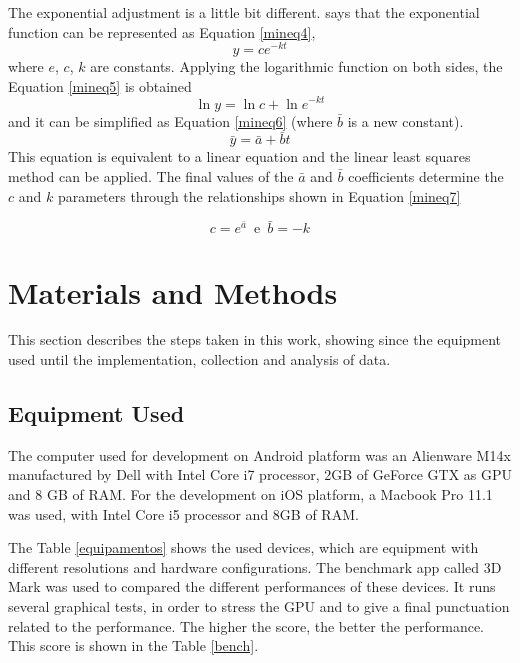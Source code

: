 \documentclass[10pt, conference, compsocconf]{IEEEtran}
\begin{document}
{The exponential adjustment is a little bit different. \cite{calculo} says
that the exponential function can be represented as Equation \ref{mineq4},
\begin{equation}
	\label{mineq4}
		y = ce^{-kt}
	\end{equation}
where $e$, $c$, $k$ are constants. Applying the logarithmic function on
both sides, the Equation \ref{mineq5} is obtained \begin{equation}
	\label{mineq5}
		\ln{y} = \ln{c}  + \ln{e^{-kt}}
	\end{equation}
	and it can be simplified
as Equation \ref{mineq6} (where $\bar{b}$ is a new constant). 
\begin{equation}
	\label{mineq6}
		\bar{y} = \bar{a} + \bar{b}t
	\end{equation}	
This equation
is equivalent to a linear equation and the linear least squares method can be applied.
The final values of the $\bar{a}$ and $\bar{b}$ coefficients determine
the $c$ and $k$ parameters through  the relationships shown in Equation \ref{mineq7}

\begin{equation}
  \label{mineq7}
	c = e^{\bar{a}}\, \, \, \mbox{e}\, \, \,\bar{b} = -k
	\end{equation} 
\section{Materials and Methods}
\label{sec:development}

This section describes the steps taken in this work, showing since the
equipment used until the implementation, collection and analysis of data.

\subsection{Equipment Used}
\label{equip}
The computer used for development on Android platform was an Alienware M14x
manufactured by Dell with Intel Core i7 processor, 2GB of GeForce GTX as GPU
and 8 GB of RAM. For the development on iOS platform, a Macbook Pro 11.1 was used, with Intel
Core i5 processor and 8GB of RAM.

  The Table \ref{equipamentos} shows the used devices, which are equipment with different
resolutions and hardware configurations. The benchmark app called
3D Mark was used to compared the different performances of these devices.
It runs several graphical tests, in order to 
stress the GPU and to give a final punctuation related to the performance. 
The higher the score, the better the performance. This score is shown
in the Table \ref{bench}.

}
\end{document}
